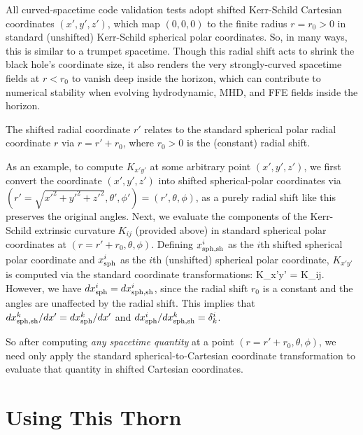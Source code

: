 All \GiR{} curved-spacetime code validation tests adopt shifted
Kerr-Schild Cartesian coordinates $(x',y',z')$, which map
$(0,0,0)$ to the finite radius $r=r_0>0$ in standard (unshifted)
Kerr-Schild spherical polar coordinates. So, in many ways, this is similar
to a trumpet spacetime. Though this radial shift acts to shrink the
black hole's coordinate size, it also renders the very
strongly-curved spacetime fields at $r<r_0$ to vanish deep inside the horizon,
which can contribute to numerical stability when evolving
hydrodynamic, MHD, and FFE fields inside the horizon.

The shifted radial coordinate $r'$ relates to the standard spherical
polar radial coordinate $r$ via $r=r'+r_0$, where $r_0>0$ is the
(constant) radial shift. 

As an example, to compute $K_{x'y'}$ at some arbitrary point
$(x',y',z')$, we first convert the coordinate $(x',y',z')$ into shifted
spherical-polar coordinates via
$(r'=\sqrt{x'^2+y'^2+z'^2},\theta',\phi')=(r',\theta,\phi)$, as a purely
radial shift like this preserves the original angles. Next, we
evaluate the components of the Kerr-Schild extrinsic curvature
$K_{ij}$ (provided above) in standard spherical polar coordinates at
$(r=r'+r_0,\theta,\phi)$. Defining $x^i_{\rm sph,sh}$ as the $i$th
shifted spherical polar coordinate and $x^i_{\rm sph}$ as the $i$th
(unshifted) spherical polar coordinate, $K_{x'y'}$ is computed via the
standard coordinate transformations:
\beq
K_{x'y'} =   
  K_{ij}. 
\eeq
However, we have $dx^i_{\rm sph} = dx^i_{\rm sph,sh}$, since the radial shift $r_0$
is a constant and the angles are unaffected by the radial shift. This
implies that $dx^k_{\rm sph,sh}/dx' = dx^k_{\rm sph}/dx'$ and 
$dx^i_{\rm sph}/dx^k_{\rm sph,sh}=\delta^i_k$.

So after computing {\it any spacetime quantity} at a
point $(r=r'+r_0,\theta,\phi)$, we need only apply the standard
spherical-to-Cartesian coordinate transformation to evaluate that
quantity in shifted Cartesian coordinates.

\section{Using This Thorn}

